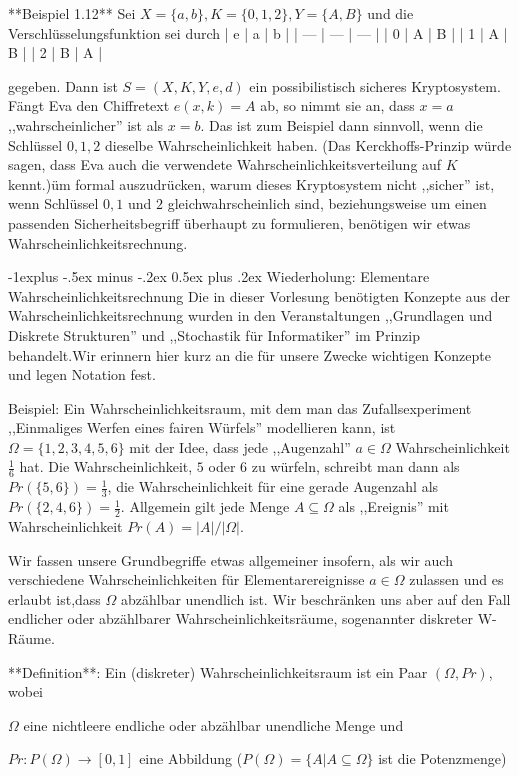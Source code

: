 \documentclass[a4paper]{article}
\makeatletter
\renewcommand{\subsection}{\@startsection{subsection}{2}{0mm}%
 {-1explus -.5ex minus -.2ex}%
 {0.5ex plus .2ex}%
 {\normalfont\normalsize\bfseries}}
\makeatother
\begin{document}
\begin{multicols}{3}
    **Beispiel 1.12** Sei $X=\{a,b\},K=\{0,1,2\},Y=\{A,B\}$ und die Verschlüsselungsfunktion sei durch
    | e   | a   | b   |
    | --- | --- | --- |
    | 0   | A   | B   |
    | 1   | A   | B   |
    | 2   | B   | A   |

    gegeben. Dann ist $S=(X,K,Y,e,d)$ ein possibilistisch sicheres Kryptosystem. Fängt Eva den Chiffretext $e(x,k) =A$ ab, so nimmt sie an, dass $x=a$ ,,wahrscheinlicher'' ist als $x=b$.
    Das ist zum Beispiel dann sinnvoll, wenn die Schlüssel $0,1,2$ dieselbe Wahrscheinlichkeit haben.
    (Das Kerckhoffs-Prinzip würde sagen, dass Eva auch die verwendete Wahrscheinlichkeitsverteilung auf $K$ kennt.)üm formal auszudrücken, warum dieses Kryptosystem nicht ,,sicher'' ist, wenn Schlüssel $0,1$ und $2$ gleichwahrscheinlich sind, beziehungsweise um einen passenden Sicherheitsbegriff überhaupt zu formulieren, benötigen wir etwas Wahrscheinlichkeitsrechnung.

    \subsection{Wiederholung: Elementare Wahrscheinlichkeitsrechnung}
    Die in dieser Vorlesung benötigten Konzepte aus der Wahrscheinlichkeitsrechnung wurden in den Veranstaltungen ,,Grundlagen und Diskrete Strukturen'' und ,,Stochastik für Informatiker'' im Prinzip behandelt.Wir erinnern hier kurz an die für unsere Zwecke wichtigen Konzepte und legen Notation fest.

    Beispiel: Ein Wahrscheinlichkeitsraum, mit dem man das Zufallsexperiment ,,Einmaliges Werfen eines fairen Würfels'' modellieren kann, ist $\Omega=\{ 1 , 2 , 3 , 4 , 5 , 6\}$ mit der Idee, dass jede  ,,Augenzahl'' $a\in\Omega$ Wahrscheinlichkeit $\frac{1}{6}$ hat. Die Wahrscheinlichkeit, $5$ oder $6$ zu würfeln, schreibt man dann als $Pr(\{5,6\})=\frac{1}{3}$, die Wahrscheinlichkeit für eine gerade Augenzahl als $Pr(\{2,4,6\})=\frac{1}{2}$. Allgemein gilt jede Menge $A\subseteq\Omega$ als ,,Ereignis''  mit Wahrscheinlichkeit $Pr(A) =|A|/|\Omega|$.

    Wir fassen unsere Grundbegriffe etwas allgemeiner insofern, als wir auch verschiedene Wahrscheinlichkeiten für Elementarereignisse $a\in\Omega$ zulassen und es erlaubt ist,dass $\Omega$ abzählbar unendlich ist. Wir beschränken uns aber auf den Fall endlicher oder abzählbarer Wahrscheinlichkeitsräume, sogenannter diskreter W-Räume.

    **Definition**: Ein (diskreter) Wahrscheinlichkeitsraum ist ein Paar $(\Omega,Pr)$, wobei
    \begin{itemize*}
        \item $\Omega$ eine nichtleere endliche oder abzählbar unendliche Menge und
        \item $Pr:P(\Omega)\rightarrow[0,1]$ eine Abbildung ($P(\Omega)=\{A|A\subseteq\Omega\}$ ist die Potenzmenge)
    \end{itemize*}


\end{multicols}
\end{document}
